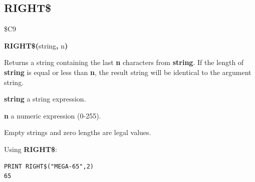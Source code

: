 
\newpage
\subsection{RIGHT\$}
\begin{description}[leftmargin=2cm,style=nextline]
\item [Token:] \$C9
\item [Format:] {\bf RIGHT\$(}string{\bf,} n{\bf)}
\item [Usage:] Returns a string
               containing the last {\bf n} characters from {\bf string}.
               If the length of {\bf string} is equal or less than {\bf n},
               the result string will be identical to the argument string.

               {\bf string} a string expression.

               {\bf n} a numeric expression (0-255).

\item [Remarks:] Empty strings and zero lengths are legal values.

\item [Example:] Using {\bf RIGHT\$}:
\begin{tcolorbox}[colback=black,coltext=white]
\verbatimfont{\codefont}
\begin{verbatim}
PRINT RIGHT$("MEGA-65",2)
65
\end{verbatim}
\end{tcolorbox}
\end{description}


\newpage
